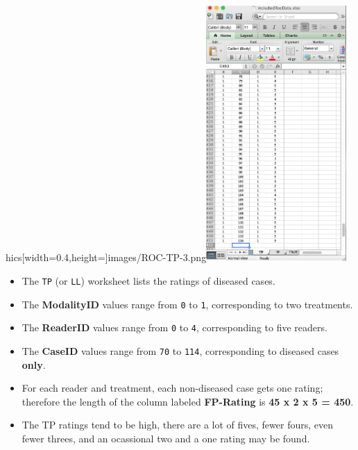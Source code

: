 \documentclass[]{book}
\providecommand{\tightlist}{%
  \setlength{\itemsep}{0pt}\setlength{\parskip}{0pt}}
\begin{document}
hics[width=0.4\textwidth,height=\textheight]{images/ROC-TP-3.png}\includegraphics[width=0.4\textwidth,height=\textheight]{images/ROC-TP-4.png}

\begin{itemize}
\tightlist
\item
  The \texttt{TP} (or \texttt{LL}) worksheet lists the ratings of diseased cases.
\item
  The \textbf{ModalityID} values range from \texttt{0} to \texttt{1}, corresponding to two treatments.
\item
  The \textbf{ReaderID} values range from \texttt{0} to \texttt{4}, corresponding to five readers.
\item
  The \textbf{CaseID} values range from \texttt{70} to \texttt{114}, corresponding to diseased cases \textbf{only}.
\item
  For each reader and treatment, each non-diseased case gets one rating; therefore the length of the column labeled \textbf{FP-Rating} is \textbf{45 x 2 x 5 = 450}.
\item
  The TP ratings tend to be high, there are a lot of fives, fewer fours, even fewer threes, and an ocassional two and a one rating may be found.
\end{itemize}
\end{document}
